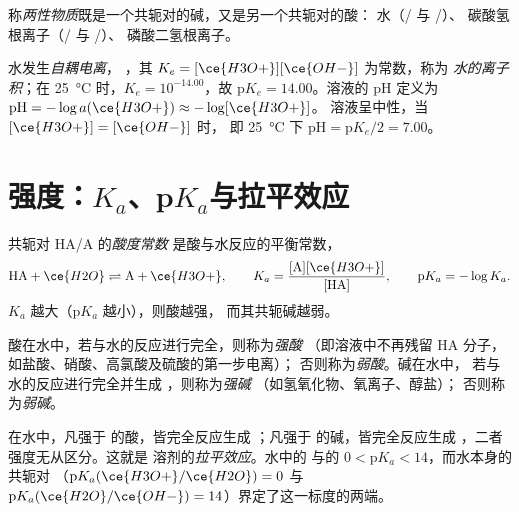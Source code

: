\begin{definition}[两性物质]\label{def:b1:predominant-reaction:ampholyte}
称\emph{两性物质}既是一个共轭对的碱，又是另一个共轭对的酸：
水（/ 与 /）、
碳酸氢根离子（/ 与 /）、
磷酸二氢根离子。
\end{definition}

\begin{definition}\label{def:b1:predominant-reaction:autoprotolysis}
水发生\emph{自耦电离}，
，其 $K_e = [\ce{H3O+}][\ce{OH-}]$ 为常数，称为
\emph{水的离子积}；在
\qty{25}{\celsius} 时，$K_e = 10^{-14.00}$，故 $\mathrm{p}K_e = 14.00$。溶液的 pH
定义为 $\mathrm{pH} = -\log a(\ce{H3O+}) \approx -\log[\ce{H3O+}]$。
溶液呈中性，当 $[\ce{H3O+}] = [\ce{OH-}]$ 时，
即 \qty{25}{\celsius} 下 $\mathrm{pH} = \mathrm{p}K_e/2 = 7.00$。
\end{definition}

\section{强度：\texorpdfstring{$K_a$}{Ka}、\texorpdfstring{p$K_a$}{pKa}与拉平效应}

\begin{definition}[酸度常数]\label{def:b1:predominant-reaction:acidity-constant}
共轭对 HA/A 的\emph{酸度常数}
是酸与水反应的平衡常数，
\[
  \mathrm{HA} + \ce{H2O} \rightleftharpoons \mathrm{A} + \ce{H3O+}, \qquad
  K_a = \frac{[\mathrm{A}][\ce{H3O+}]}{[\mathrm{HA}]}, \qquad
  \mathrm{p}K_a = -\log K_a .
\]
$K_a$ 越大（$\mathrm{p}K_a$ 越小），则酸越强，
而其共轭碱越弱。
\end{definition}

\begin{definition}\label{def:b1:predominant-reaction:strong-acid}
酸在水中，若与水的反应进行完全，则称为\emph{强酸}
（即溶液中不再残留 HA 分子，如盐酸、硝酸、高氯酸及硫酸的第一步电离）；
否则称为\emph{弱酸}。碱在水中，
若与水的反应进行完全并生成 ，则称为\emph{强碱}
（如氢氧化物、氧离子、醇盐）；
否则称为\emph{弱碱}。
\end{definition}

\begin{definition}[拉平效应]\label{def:b1:predominant-reaction:levelling}
在水中，凡强于  的酸，皆完全反应生成
；凡强于  的碱，皆完全反应生成
，二者强度无从区分。这就是
溶剂的\emph{拉平效应}。水中的
与的 $0 < \mathrm{p}K_a < 14$，而水本身的共轭对
（$\mathrm{p}K_a(\ce{H3O+}/\ce{H2O}) = 0$ 与
$\mathrm{p}K_a(\ce{H2O}/\ce{OH-}) = 14$）界定了这一标度的两端。
\end{definition}

